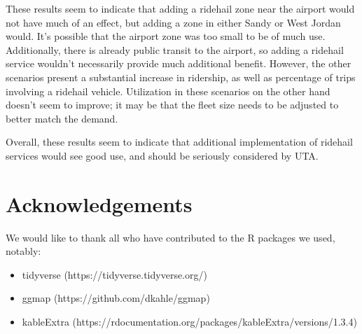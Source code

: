 \documentclass[3p, authoryear]{elsarticle} %
\providecommand{\tightlist}{%
  \setlength{\itemsep}{0pt}\setlength{\parskip}{0pt}}
\begin{document}
\begin{table}[H]

\caption{\label{tab:comparison}Comparison of Simulated Scenarios}
\centering
{}
\end{table}

These results seem to indicate that adding a ridehail zone near the airport would not have much of an effect, but adding a zone in either Sandy or West Jordan would. It's possible that the airport zone was too small to be of much use. Additionally, there is already public transit to the airport, so adding a ridehail service wouldn't necessarily provide much additional benefit. However, the other scenarios present a substantial increase in ridership, as well as percentage of trips involving a ridehail vehicle. Utilization in these scenarios on the other hand doesn't seem to improve; it may be that the fleet size needs to be adjusted to better match the demand.

Overall, these results seem to indicate that additional implementation of ridehail services would see good use, and should be seriously considered by UTA.

\hypertarget{acknowledgements}{%
\section*{Acknowledgements}\label{acknowledgements}}

We would like to thank all who have contributed to the R packages we used, notably:

\begin{itemize}
\tightlist
\item
  tidyverse (https://tidyverse.tidyverse.org/)
\item
  ggmap (https://github.com/dkahle/ggmap)
\item
  kableExtra (https://rdocumentation.org/packages/kableExtra/versions/1.3.4)
\end{itemize}


\end{document}
